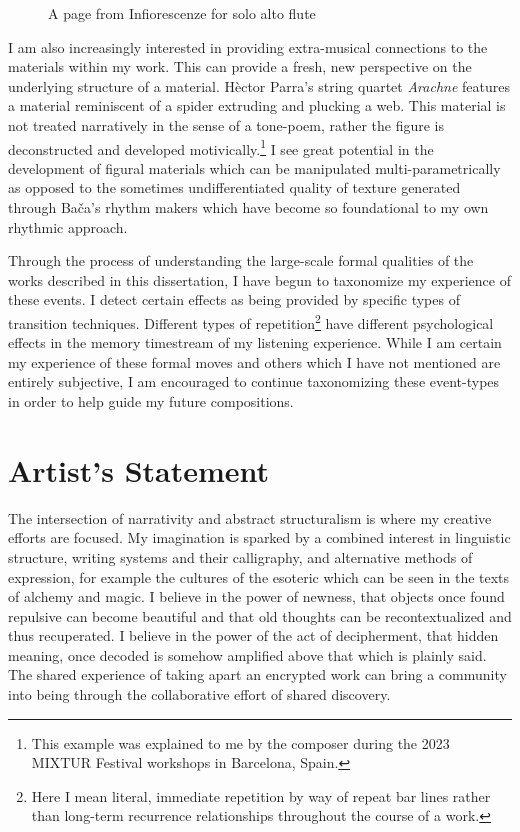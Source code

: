 \begin{figure}[p]
\centering
    \caption{A page from Infiorescenze for solo alto flute}
    \label{fig:infiorescenze}
\end{figure}

I am also increasingly interested in providing extra-musical connections to the materials within my work. This can provide a fresh, new perspective on the underlying structure of a material. Hèctor Parra's string quartet \textit{Arachne} features a material reminiscent of a spider extruding and plucking a web. This material is not treated narratively in the sense of a tone-poem, rather the figure is deconstructed and developed motivically.\footnote{This example was explained to me by the composer during the 2023 MIXTUR Festival workshops in Barcelona, Spain.} I see great potential in the development of figural materials which can be manipulated multi-parametrically as opposed to the sometimes undifferentiated quality of texture generated through Bača's rhythm makers which have become so foundational to my own rhythmic approach.

Through the process of understanding the large-scale formal qualities of the works described in this dissertation, I have begun to taxonomize my experience of these events. I detect certain effects as being provided by specific types of transition techniques. Different types of repetition\footnote{Here I mean literal, immediate repetition by way of repeat bar lines rather than long-term recurrence relationships throughout the course of a work.} have different psychological effects in the memory timestream of my listening experience. While I am certain my experience of these formal moves and others which I have not mentioned are entirely subjective, I am encouraged to continue taxonomizing these event-types in order to help guide my future compositions.

\section{Artist's Statement}

The intersection of narrativity and abstract structuralism is where my creative efforts are focused. My imagination is sparked by a combined interest in linguistic structure, writing systems and their calligraphy, and alternative methods of expression, for example the cultures of the esoteric which can be seen in the texts of alchemy and magic. I believe in the power of newness, that objects once found repulsive can become beautiful and that old thoughts can be recontextualized and thus recuperated. I believe in the power of the act of decipherment, that hidden meaning, once decoded is somehow amplified above that which is plainly said. The shared experience of taking apart an encrypted work can bring a community into being through the collaborative effort of shared discovery.

